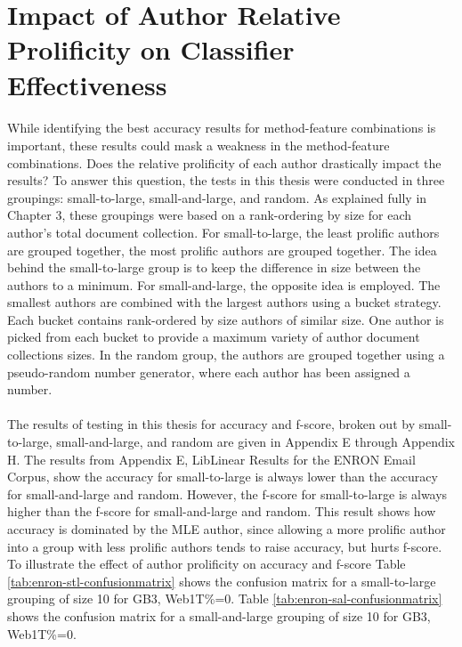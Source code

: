 \section{Impact of Author Relative Prolificity on Classifier Effectiveness}
	\paragraph*{} While identifying the best accuracy results for method-feature combinations is important, these results could mask a weakness in the method-feature combinations.  Does the relative prolificity of each author drastically impact the results?  To answer this question, the tests in this thesis were conducted in three groupings: small-to-large, small-and-large, and random.  As explained fully in Chapter 3, these groupings were based on a rank-ordering by size for each author's total document collection.  For small-to-large, the least prolific authors are grouped together, the most prolific authors are grouped together. The idea behind the small-to-large group is to keep the difference in size between the authors to a minimum. For small-and-large, the opposite idea is employed.  The smallest authors are combined with the largest authors using a bucket strategy.  Each bucket contains rank-ordered by size authors of similar size.  One author is picked from each bucket to provide a maximum variety of author document collections sizes.  In the random group, the authors are grouped together using a pseudo-random number generator, where each author has been assigned a number.
	\paragraph*{} The results of testing in this thesis for accuracy and f-score, broken out by small-to-large, small-and-large, and random are given in Appendix E through Appendix H.  The results from Appendix E, LibLinear Results for the ENRON Email Corpus, show the accuracy for small-to-large is always lower than the accuracy for small-and-large and random.  However, the f-score for small-to-large is always higher than the f-score for small-and-large and random.  This result shows how accuracy is dominated by the MLE author, since allowing a more prolific author into a group with less prolific authors tends to raise accuracy, but hurts f-score. To illustrate the effect of author prolificity on accuracy and f-score Table \ref{tab:enron-stl-confusionmatrix} shows the confusion matrix for a small-to-large grouping of size 10 for GB3, Web1T\%=0.  Table \ref{tab:enron-sal-confusionmatrix} shows the confusion matrix for a small-and-large grouping of size 10 for GB3, Web1T\%=0. 
	
